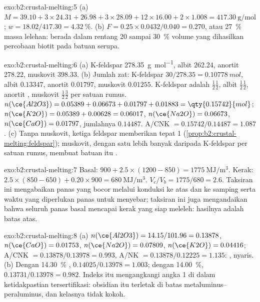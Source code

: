 \begin{solution}{exo:b2:crustal-melting:5}
(a) $M = 39.10 + 3\times24.31 + 26.98 + 3\times28.09 + 12\times16.00 + 2\times1.008 =
\qty{417.30}{\gram\per\mole}$; $w = 18.02/417.30 = \qty{4.32}{\percent}$.
(b) $F = 0.25\times0.0432/0.040 = 0.270$, atau \qty{27}{\percent} massa lelehan: berada dalam rentang
20 sampai \qty{30}{\percent} volume yang dihasilkan percobaan  biotit pada
batuan serupa.
\end{solution}

\begin{solution}{exo:b2:crustal-melting:6}
(a) K-feldspar \qty{278.35}{\gram\per\mole}, albit 262.24, anortit 278.22, muskovit
398.33. (b) Jumlah zat: K-feldspar $30/278.35 = \qty{0.10778}{mol}$, albit $0.13347$,
anortit $0.01797$, muskovit $0.01255$. K-feldspar adalah $\tfrac12$$\tfrac12$,
albit $\tfrac12$$\tfrac12$, anortit , muskovit
$\tfrac12$$\tfrac32$ per satuan rumus. $n(\ce{Al2O3}) = 0.05389 +
0.06673 + 0.01797 + 0.01883 = \qty{0.15742}{mol}$; $n(\ce{K2O}) = 0.05389 + 0.00628 =
0.06017$, $n(\ce{Na2O}) = 0.06673$, $n(\ce{CaO}) = 0.01797$, jumlahnya $0.14487$.
A/CNK $= 0.15742/0.14487 = 1.087$. (c) Tanpa muskovit, ketiga feldspar memberikan
tepat 1 (\cref{prop:b2:crustal-melting:feldspar}); muskovit, dengan satu 
lebih banyak daripada K-feldspar per satuan rumus, membuat batuan itu .
\end{solution}

\begin{solution}{exo:b2:crustal-melting:7}
Basal: $900 + 2.5\times(1200 - 850) = \qty{1775}{\mega\joule\per\cubic\metre}$. Kerak:
$2.5\times(850 - 650) + 0.20\times900 = \qty{680}{\mega\joule\per\cubic\metre}$.
$V_c/V_b = 1775/680 = 2.6$. Taksiran ini mengabaikan panas yang bocor melalui konduksi
ke atas dan ke samping serta waktu yang diperlukan panas untuk menyebar; taksiran ini juga mengandaikan bahwa seluruh
panas basal mencapai kerak yang siap meleleh: hasilnya adalah batas atas.
\end{solution}

\begin{solution}{exo:b2:crustal-melting:8}
(a) $n(\ce{Al2O3}) = 14.15/101.96 = 0.13878$, $n(\ce{CaO}) = 0.01753$, $n(\ce{Na2O}) =
0.07809$, $n(\ce{K2O}) = 0.04416$; A/CNK $= 0.13878/0.13978 = 0.993$, A/NK $=
0.13878/0.12225 = 1.135$: , nyaris. (b) Dengan \qty{14.30}{\percent} ,
$0.14025/0.13978 = 1.003$; dengan \qty{14.00}{\percent}, $0.13731/0.13978 = 0.982$. Indeks itu
mengangkangi angka 1 di dalam ketidakpastian tersertifikasi: obsidian itu terletak di
batas metaluminus--peraluminus, dan kelasnya tidak kokoh.
\end{solution}

